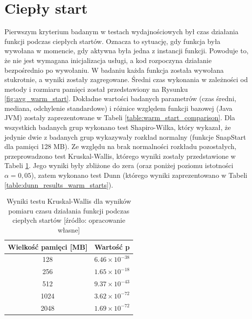 \section{Ciepły start}\label{chapter:results_warm_start}

Pierwszym kryterium badanym w testach wydajnościowych był czas działania funkcji podczas ciepłych startów.
Oznacza to sytuację, gdy funkcja była wywołana w momencie, gdy aktywna była jedna z instancji funkcji.
Powoduje to, że nie jest wymagana inicjalizacja usługi, a kod rozpoczyna działanie bezpośrednio po wywołaniu.
W badaniu każda funkcja została wywołana stukrotnie, a wyniki zostały zagregowane.
Średni czas wykonania w zależności od metody i rozmiaru pamięci został przedstawiony na Rysunku \ref{fig:avg_warm_start}.
Dokładne wartości badanych parametrów (czas średni, mediana, odchylenie standardowe) i różnice względem funkcji bazowej (Java JVM) zostały zaprezentowane w Tabeli \ref{table:warm_start_comparison}.
Dla wszystkich badanych grup wykonano test Shapiro-Wilka, który wykazał, że jedynie dwie z badanych grup wykazywały rozkład normalny (funkcje SnapStart dla pamięci 128 MB).
Ze względu na brak normalności rozkładu pozostałych, przeprowadzono test Kruskal-Wallis, którego wyniki zostały przedstawione w Tabeli \ref{table:kruskal_wallis_test_warm_starts}.
Jego wyniki były zbliżone do zera (oraz poniżej poziomu istotności $\alpha = 0,05$), zatem wykonano test Dunn (którego wyniki zaprezentowano w Tabeli \ref{table:dunn_results_warm_starts}).

\begin{table}[h!]
    \centering
    \caption{Wyniki testu Kruskal-Wallis dla wyników pomiaru czasu działania funkcji podczas ciepłych startów [źródło: opracowanie własne]}
    \begin{tabular}{|c|c|}
    \hline
    \textbf{Wielkość pamięci [MB]} & \textbf{Wartość p} \\
    \hline
    128 & $6.46 \times 10^{-38}$ \\
    \hline
    256 & $1.65 \times 10^{-18}$ \\
    \hline
    512 & $9.37 \times 10^{-43}$ \\
    \hline
    1024 & $3.62 \times 10^{-72}$ \\
    \hline
    2048 & $1.69 \times 10^{-72}$ \\
    \hline
    \end{tabular}
    \label{table:kruskal_wallis_test_warm_starts}
\end{table}

